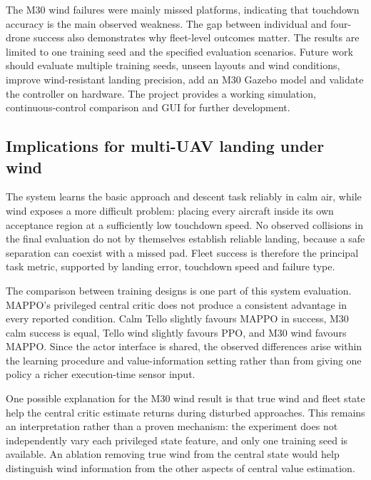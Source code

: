 The M30 wind failures were mainly missed platforms, indicating that touchdown accuracy is the main observed weakness. The gap between individual and four-drone success also demonstrates why fleet-level outcomes matter. The results are limited to one training seed and the specified evaluation scenarios. Future work should evaluate multiple training seeds, unseen layouts and wind conditions, improve wind-resistant landing precision, add an M30 Gazebo model and validate the controller on hardware. The project provides a working simulation, continuous-control comparison and GUI for further development.

\hypertarget{implications-for-multi-uav-landing-under-wind}{%
\subsection{Implications for multi-UAV landing under wind}\label{implications-for-multi-uav-landing-under-wind}}

The system learns the basic approach and descent task reliably in calm air, while wind exposes a more difficult problem: placing every aircraft inside its own acceptance region at a sufficiently low touchdown speed. No observed collisions in the final evaluation do not by themselves establish reliable landing, because a safe separation can coexist with a missed pad. Fleet success is therefore the principal task metric, supported by landing error, touchdown speed and failure type.

The comparison between training designs is one part of this system evaluation. MAPPO's privileged central critic does not produce a consistent advantage in every reported condition. Calm Tello slightly favours MAPPO in success, M30 calm success is equal, Tello wind slightly favours PPO, and M30 wind favours MAPPO. Since the actor interface is shared, the observed differences arise within the learning procedure and value-information setting rather than from giving one policy a richer execution-time sensor input.

One possible explanation for the M30 wind result is that true wind and fleet state help the central critic estimate returns during disturbed approaches. This remains an interpretation rather than a proven mechanism: the experiment does not independently vary each privileged state feature, and only one training seed is available. An ablation removing true wind from the central state would help distinguish wind information from the other aspects of central value estimation.

